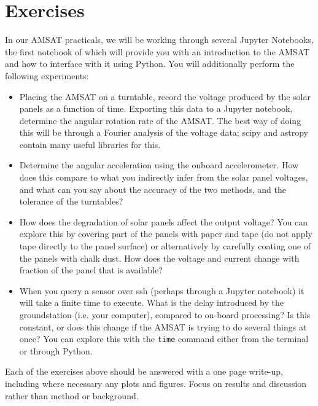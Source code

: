 \documentclass{tufte-book}
\begin{document}
\section{Exercises}

In our AMSAT practicals, we will be working through several Jupyter Notebooks, the first notebook of which will provide you with an introduction to the AMSAT and how to interface with it using Python. You will additionally perform the following experiments:

\begin{tcolorbox}[sharp corners=all, colback=white!75!green]
\begin{itemize}   
\item Placing the AMSAT on a turntable, record the voltage produced by the solar panels as a function of time. Exporting this data to a Jupyter notebook, determine the angular rotation rate of the AMSAT. The best way of doing this will be through a Fourier analysis of the voltage data; scipy and astropy contain many useful libraries for this.
\item Determine the angular acceleration using the onboard accelerometer. How does this compare to what you indirectly infer from the solar panel voltages, and what can you say about the accuracy of the two methods, and the tolerance of the turntables?
\item How does the degradation of solar panels affect the output voltage? You can explore this by covering part of the panels with paper and tape (do not apply tape directly to the panel surface) or alternatively by carefully coating one of the panels with chalk dust. How does the voltage and current change with fraction of the panel that is available?
\item When you query a sensor over ssh (perhaps through a Jupyter notebook) it will take a finite time to execute. What is the delay introduced by the groundstation (i.e. your computer), compared to on-board processing? Is this constant, or does this change if the AMSAT is trying to do several things at once? You can explore this with the \verb|time| command either from the terminal or through Python.
\end{itemize}

\end{tcolorbox} 


Each of the exercises above should be answered with a one page write-up, including where necessary any plots and figures. Focus on results and discussion rather than method or background.
\end{document}
